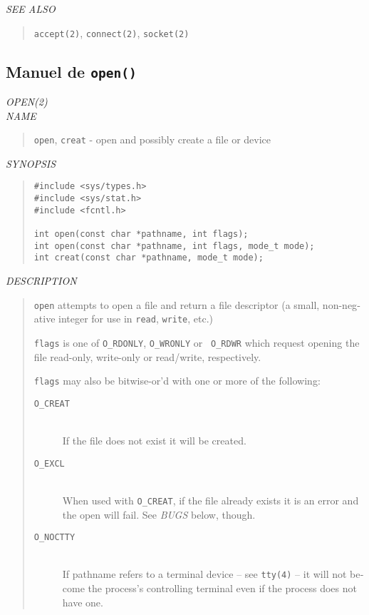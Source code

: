 \begin{appendix}
\begin{english}
{\sl SEE ALSO}
\begin{quote}
	{\tt accept(2)}, {\tt connect(2)}, {\tt socket(2)}
\end{quote}
\end{english}

\subsection{Manuel de {\tt open()}}
\begin{english}
{\sl OPEN(2)}\\

{\sl NAME}
\begin{quote}
	{\tt open}, {\tt creat} - open and possibly create a file or device
\end{quote}

{\sl SYNOPSIS}
\begin{quote}
\begin{verbatim}
#include <sys/types.h>
#include <sys/stat.h>
#include <fcntl.h>

int open(const char *pathname, int flags);
int open(const char *pathname, int flags, mode_t mode);
int creat(const char *pathname, mode_t mode);
\end{verbatim}
\end{quote}

{\sl DESCRIPTION}
\begin{quote}
	{\tt open} attempts to open a file and return a file descriptor (a
	small, non-negative integer for use in {\tt read}, {\tt write},
	etc.)

	{\tt flags} is one of {\tt O\_RDONLY}, {\tt O\_WRONLY} or {\tt
	O\_RDWR} which request opening the file read-only, write-only or
	read/write, respectively.

	{\tt flags} may also be bitwise-or'd with one or more of the
	following:
	\begin{description}
		\item[{\tt O\_CREAT}]\mbox{}\\
		If the file does not exist it will be created. \\

		\item[{\tt O\_EXCL}]\mbox{}\\
		When used with {\tt O\_CREAT}, if the file already exists
		it is an error and the open will fail. See {\sl BUGS}
		below, though. \\

		\item[{\tt O\_NOCTTY}]\mbox{}\\
		If pathname refers to a terminal device -- see
		{\tt tty(4)} -- it will not become the process's controlling
		terminal even if the process does not have one.\\


\end{description}
\end{quote}
\end{english}
\end{appendix}
